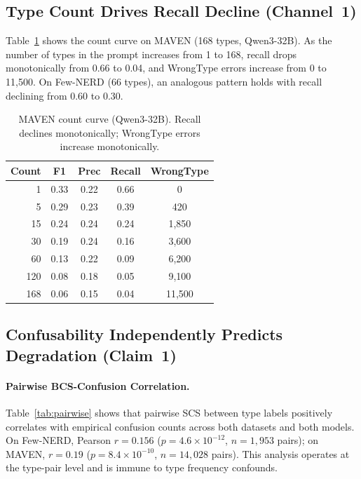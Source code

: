 \documentclass[11pt,a4paper]{article}
\begin{document}
\subsection{Type Count Drives Recall Decline (Channel~1)}
\label{sec:count_curve}

Table~\ref{tab:maven_count} shows the count curve on MAVEN (168 types, Qwen3-32B).
As the number of types in the prompt increases from 1 to 168, recall drops monotonically from 0.66 to 0.04, and WrongType errors increase from 0 to 11{,}500.
On Few-NERD (66 types), an analogous pattern holds with recall declining from 0.60 to 0.30.

\begin{table}[t]
\centering
\small
\caption{MAVEN count curve (Qwen3-32B). Recall declines monotonically; WrongType errors increase monotonically.}
\label{tab:maven_count}
\begin{tabular}{rcccc}
\toprule
\textbf{Count} & \textbf{F1} & \textbf{Prec} & \textbf{Recall} & \textbf{WrongType} \\
\midrule
1   & 0.33 & 0.22 & 0.66 & 0 \\
5   & 0.29 & 0.23 & 0.39 & 420 \\
15  & 0.24 & 0.24 & 0.24 & 1{,}850 \\
30  & 0.19 & 0.24 & 0.16 & 3{,}600 \\
60  & 0.13 & 0.22 & 0.09 & 6{,}200 \\
120 & 0.08 & 0.18 & 0.05 & 9{,}100 \\
168 & 0.06 & 0.15 & 0.04 & 11{,}500 \\
\bottomrule
\end{tabular}
\end{table}

\subsection{Confusability Independently Predicts Degradation (Claim~1)}
\label{sec:confusability}

\paragraph{Pairwise BCS-Confusion Correlation.}
Table~\ref{tab:pairwise} shows that pairwise SCS between type labels positively correlates with empirical confusion counts across both datasets and both models.
On Few-NERD, Pearson $r{=}0.156$ ($p{=}4.6{\times}10^{-12}$, $n{=}1{,}953$ pairs); on MAVEN, $r{=}0.19$ ($p{=}8.4{\times}10^{-10}$, $n{=}14{,}028$ pairs).
This analysis operates at the type-pair level and is immune to type frequency confounds.
\end{document}
